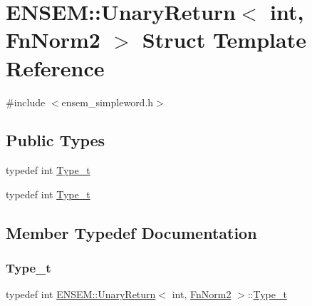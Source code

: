 \hypertarget{structENSEM_1_1UnaryReturn_3_01int_00_01FnNorm2_01_4}{}\section{E\+N\+S\+EM\+:\+:Unary\+Return$<$ int, Fn\+Norm2 $>$ Struct Template Reference}
\label{structENSEM_1_1UnaryReturn_3_01int_00_01FnNorm2_01_4}


{\ttfamily \#include $<$ensem\+\_\+simpleword.\+h$>$}

\subsection*{Public Types}
\begin{DoxyCompactItemize}
\item 
typedef int \mbox{\hyperlink{structENSEM_1_1UnaryReturn_3_01int_00_01FnNorm2_01_4_ae4204ae93a1e761995e0aaab5504ea66}{Type\+\_\+t}}
\item 
typedef int \mbox{\hyperlink{structENSEM_1_1UnaryReturn_3_01int_00_01FnNorm2_01_4_ae4204ae93a1e761995e0aaab5504ea66}{Type\+\_\+t}}
\end{DoxyCompactItemize}


\subsection{Member Typedef Documentation}
\mbox{\label{structENSEM_1_1UnaryReturn_3_01int_00_01FnNorm2_01_4_ae4204ae93a1e761995e0aaab5504ea66}} 
\subsubsection{\texorpdfstring{Type\_t}{Type\_t}\hspace{0.1cm}{\footnotesize\ttfamily [1/2]}}
{\footnotesize\ttfamily typedef int \mbox{\hyperlink{structENSEM_1_1UnaryReturn}{E\+N\+S\+E\+M\+::\+Unary\+Return}}$<$ int, \mbox{\hyperlink{structENSEM_1_1FnNorm2}{Fn\+Norm2}} $>$\+::\mbox{\hyperlink{structENSEM_1_1UnaryReturn_3_01int_00_01FnNorm2_01_4_ae4204ae93a1e761995e0aaab5504ea66}{Type\+\_\+t}}}

\mbox{\label{structENSEM_1_1UnaryReturn_3_01int_00_01FnNorm2_01_4_ae4204ae93a1e761995e0aaab5504ea66}} 

